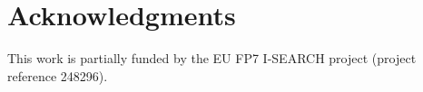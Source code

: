 \documentclass{acm_proc_article-sp}
\begin{document}

\section{Acknowledgments}\label{sec:acknowledgments}
This work is partially funded by the EU FP7 I-SEARCH project (project reference 248296).

%

%
%

\end{document}
